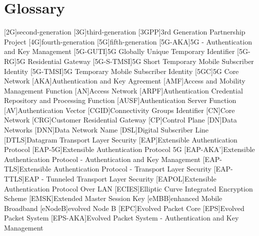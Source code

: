 \chapter{Glossary}

\footnotesize
\SingleSpacing

\begin{multicols}{2}
    \begin{acronym}[AAAAAA]
        [2G]{second-generation}
        [3G]{third-generation}
        [3GPP]{3rd Generation Partnership Project}
        [4G]{fourth-generation}
        [5G]{fifth-generation}
        [5G-AKA]{5G - Authentication and Key Management}
        [5G-GUTI]{5G Globally Unique Temporary Identifier}
        [5G-RG]{5G Residential Gateway}
        [5G-S-TMSI]{5G Short Temporary Mobile Subscriber Identity}
        [5G-TMSI]{5G Temporary Mobile Subscriber Identity}
        [5GC]{5G Core Network}
        [AKA]{Authentication and Key Agreement}
        [AMF]{Access and Mobility Management Function}
        [AN]{Access Network}
        [ARPF]{Authentication Credential Repository and Processing Function}
        [AUSF]{Authentication Server Function}
        [AV]{Authentication Vector}
        [CGID]{Connectivity Groups Identifier}
        [CN]{Core Network}
        [CRG]{Customer Residential Gateway}
        [CP]{Control Plane}
        [DN]{Data Networks}
        [DNN]{Data Network Name}
        [DSL]{Digital Subscriber Line}
        [DTLS]{Datagram Transport Layer Security}
        [EAP]{Extensible Authentication Protocol}
        [EAP-5G]{Extensible Authentication Protocol 5G}
        [EAP-AKA']{Extensible Authentication Protocol - Authentication and Key Management}
        [EAP-TLS]{Extensible Authentication Protocol - Transport Layer Security}
        [EAP-TTLS]{EAP - Tunneled Transport Layer Security}
        [EAPOL]{Extensible Authentication Protocol Over LAN}
        [ECIES]{Elliptic Curve Integrated Encryption Scheme}
        [EMSK]{Extended Master Session Key}
        [eMBB]{enhanced Mobile Broadband}
        [eNodeB]{evolved Node B}
        [EPC]{Evolved Packet Core}
        [EPS]{Evolved Packet System}
        [EPS-AKA]{Evolved Packet System - Authentication and Key Management}

\end{acronym}
\end{multicols}
